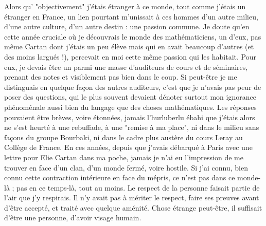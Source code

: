 Alors qu' "objectivement" j'étais étranger à ce monde, tout comme j'étais un étranger en France, un lien pourtant m'unissait à ces hommes d'un autre milieu, d'une autre culture, d'un autre destin : une passion commune. Je doute qu'en cette année cruciale où je découvrais le monde des mathématiciens, un d'eux, pas même Cartan dont j'étais un peu élève mais qui en avait beaucoup d'autres (et des moins largués !), percevait en moi cette même passion qui les habitait. Pour eux, je devais être un parmi une masse d'auditeurs de cours et de séminaires, prenant des notes et visiblement pas bien dans le coup. Si peut-être je me distinguais en quelque façon des autres auditeurs, c'est que je n'avais pas peur de poser des questions, qui le plus souvent devaient dénoter surtout mon ignorance phénoménale aussi bien du langage que des choses mathématiques. Les réponses pouvaient être brèves, voire étonnées, jamais l'hurluberlu ébahi que j'étais alors ne s'est heurté à une rebuffade, à une "remise à ma place", ni dans le milieu sans façons du groupe Bourbaki, ni dans le cadre plus austère du cours Leray au Collège de France. En ces années, depuis que j'avais débarqué à Paris avec une lettre pour Elie Cartan dans ma poche, jamais je n'ai eu l'impression de me trouver en face d'un clan, d'un monde fermé, voire hostile. Si j'ai connu, bien connu cette contraction intérieure en face du mépris, ce n'est pas dans ce monde-là ; pas en ce temps-là, tout au moins. Le respect de la personne faisait partie de l'air que j'y respirais. Il n'y avait pas à mériter le respect, faire ses preuves avant d'être accepté, et traité avec quelque aménité. Chose étrange peut-être, il suffisait d'être une personne, d'avoir visage humain.


